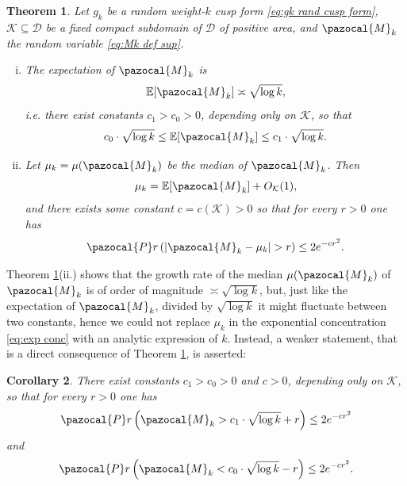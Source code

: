 \documentclass[12pt, a4paper]{amsart}
\newtheorem{theorem}{Theorem}[section]
\newtheorem{corollary}[theorem]{Corollary}
\theoremstyle{definition}
\newcommand {\E} {\mathbb{E}}
\newcommand {\1} {\mathbf{1}}
\newcommand {\M} {\pazocal {M}}
\newcommand{\prob}{\pazocal{P}r}
\newcommand {\Dc} {\mathcal{D}}
\newcommand {\Kc} {\mathcal{K}}
\numberwithin{equation}{section}
\begin{document}
\begin{theorem}
\label{thm:mean mag exp conc}
Let $g_{k}$ be a random weight-$k$ cusp form \eqref{eq:gk rand cusp form}, $\Kc\subseteq\Dc$ be a fixed compact subdomain of $\Dc$ of positive area, and $\M_{k}$ the random variable \eqref{eq:Mk def sup}.

\begin{enumerate}[i.]

\item The expectation of $\M_{k}$ is
\begin{equation*}
\E[\M_{k}] \asymp \sqrt{\log{k}},
\end{equation*}
i.e. there exist constants $c_{1}>c_{0}>0$, depending only on $\Kc$, so that
\begin{equation}
\label{eq:exp sup comm sqrt(logk)}
c_{0}\cdot \sqrt{\log{k}} \le \E[\M_{k}] \le c_{1}\cdot \sqrt{\log{k}}.
\end{equation}

\item Let $\mu_{k}=\mu(\M_{k})$ be the median of $\M_{k}$. Then
\begin{equation}
\label{eq:mean_median_diff}
\mu_{k} = \E[\M_{k}] + O_{\Kc}(1),
\end{equation}
and there exists some constant $c=c(\Kc)>0$ so that for every $r>0$ one has
\begin{equation}
\label{eq:exp conc}
\prob\left( \left|\M_{k}-\mu_{k}\right|>r\right) \le 2e^{-cr^{2}}.
\end{equation}


\end{enumerate}


\end{theorem}


Theorem \ref{thm:mean mag exp conc}(ii.) shows that the growth rate of the median $\mu(\M_{k})$ of $\M_{k}$ is of order of magnitude $\asymp \sqrt{\log{k}}$, but, just like the expectation of $\M_{k}$, divided by $\sqrt{\log{k}}$ it might fluctuate between
two constants, hence we could not replace $\mu_{k}$ in the exponential concentration \eqref{eq:exp conc} with an analytic expression of $k$. Instead, a weaker statement, that is a direct consequence of
Theorem \ref{thm:mean mag exp conc}, is asserted:


\begin{corollary}
\label{cor:exp decay prob}
There exist constants $c_{1}>c_{0}>0$ and $c>0$, depending only on $\Kc$, so that for every $r>0$ one has
\begin{equation*}
\prob\left( \M_{k}>c_{1}\cdot \sqrt{\log{k}}+r  \right) \le 2e^{-cr^{2}}
\end{equation*}
and
\begin{equation*}
\prob\left( \M_{k} < c_{0}\cdot \sqrt{\log{k}}-r  \right)\le 2e^{-cr^{2}}.
\end{equation*}
\end{corollary}
\end{document}
